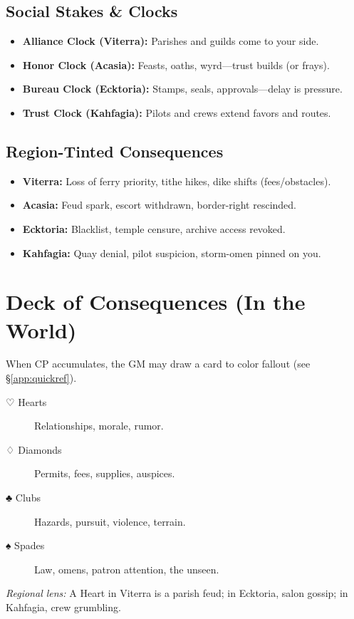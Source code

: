 \begin{multicols}{2}
\subsection*{Social Stakes \& Clocks}
\begin{itemize}
  \item \textbf{Alliance Clock (Viterra):} Parishes and guilds come to your side.
  \item \textbf{Honor Clock (Acasia):} Feasts, oaths, wyrd—trust builds (or frays).
  \item \textbf{Bureau Clock (Ecktoria):} Stamps, seals, approvals—delay is pressure.
  \item \textbf{Trust Clock (Kahfagia):} Pilots and crews extend favors and routes.
\end{itemize}

\subsection*{Region-Tinted Consequences}
\begin{itemize}
  \item \textbf{Viterra:} Loss of ferry priority, tithe hikes, dike shifts (fees/obstacles).
  \item \textbf{Acasia:} Feud spark, escort withdrawn, border-right rescinded.
  \item \textbf{Ecktoria:} Blacklist, temple censure, archive access revoked.
  \item \textbf{Kahfagia:} Quay denial, pilot suspicion, storm-omen pinned on you.
\end{itemize}

\section{Deck of Consequences (In the World)}
When CP accumulates, the GM may draw a card to color fallout (see \S\ref{app:quickref}).
\begin{description}
  \item[♡ Hearts]  Relationships, morale, rumor.
  \item[♢ Diamonds]  Permits, fees, supplies, auspices.
  \item[♣ Clubs]  Hazards, pursuit, violence, terrain.
  \item[♠ Spades]  Law, omens, patron attention, the unseen.
\end{description}
\emph{Regional lens:} A Heart in Viterra is a parish feud; in Ecktoria, salon gossip; in Kahfagia, crew grumbling.


\end{multicols}
